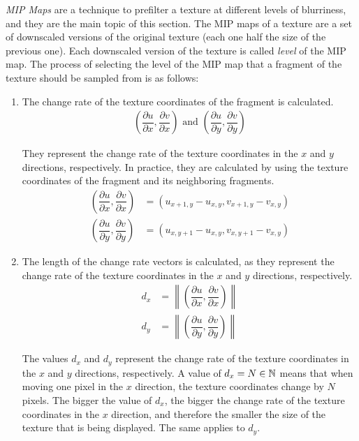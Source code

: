 \emph{MIP Maps} are a technique to prefilter a texture at different levels of blurriness, and they are the main topic of this section. The MIP maps of a texture are a set of downscaled versions of the original texture (each one half the size of the previous one). Each downscaled version of the texture is called \emph{level} of the MIP map. The process of selecting the level of the MIP map that a fragment of the texture should be sampled from is as follows:
\begin{enumerate}
    \item The change rate of the texture coordinates of the fragment is calculated.
    \begin{align*}
        \left(\dfrac{\partial u}{\partial x}, \dfrac{\partial v}{\partial x}\right) \text{ and } \left(\dfrac{\partial u}{\partial y}, \dfrac{\partial v}{\partial y}\right)
    \end{align*}

    They represent the change rate of the texture coordinates in the $x$ and $y$ directions, respectively. In practice, they are calculated by using the texture coordinates of the fragment and its neighboring fragments.
    \begin{align*}
        \left(\dfrac{\partial u}{\partial x}, \dfrac{\partial v}{\partial x}\right) &= \left(u_{x+1,y}-u_{x,y}, v_{x+1,y}-v_{x,y}\right) \\
        \left(\dfrac{\partial u}{\partial y}, \dfrac{\partial v}{\partial y}\right) &= \left(u_{x,y+1}-u_{x,y}, v_{x,y+1}-v_{x,y}\right)
    \end{align*}

    \item The length of the change rate vectors is calculated, as they represent the change rate of the texture coordinates in the $x$ and $y$ directions, respectively.
    \begin{align*}
        d_x &= \left\|\left(\dfrac{\partial u}{\partial x}, \dfrac{\partial v}{\partial x}\right)\right\| \\
        d_y &= \left\|\left(\dfrac{\partial u}{\partial y}, \dfrac{\partial v}{\partial y}\right)\right\|
    \end{align*}

    The values $d_x$ and $d_y$ represent the change rate of the texture coordinates in the $x$ and $y$ directions, respectively. A value of $d_x=N\in \mathbb{N}$ means that when moving one pixel in the $x$ direction, the texture coordinates change by $N$ pixels. The bigger the value of $d_x$, the bigger the change rate of the texture coordinates in the $x$ direction, and therefore the smaller the size of the texture that is being displayed. The same applies to $d_y$.


\end{enumerate}
